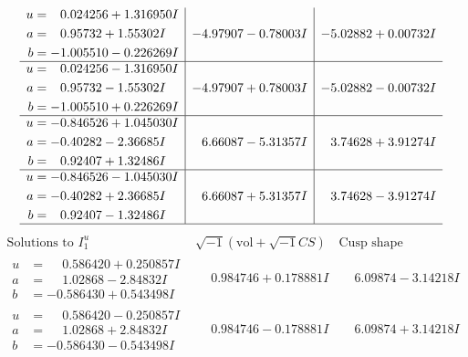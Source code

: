 \documentclass[1p]{elsarticle_modified}
\theoremstyle{definition}
\newcommand{\I}{\sqrt{-1}}
\begin{document}
$$\begin{array}{c|c|c}
\begin{aligned}
u &= \phantom{-}0.024256 + 1.316950 I \\
a &= \phantom{-}0.95732 + 1.55302 I \\
b &= -1.005510 - 0.226269 I\end{aligned}
 & -4.97907 - 0.78003 I & -5.02882 + 0.00732 I \\ \hline\begin{aligned}
u &= \phantom{-}0.024256 - 1.316950 I \\
a &= \phantom{-}0.95732 - 1.55302 I \\
b &= -1.005510 + 0.226269 I\end{aligned}
 & -4.97907 + 0.78003 I & -5.02882 - 0.00732 I \\ \hline\begin{aligned}
u &= -0.846526 + 1.045030 I \\
a &= -0.40282 - 2.36685 I \\
b &= \phantom{-}0.92407 + 1.32486 I\end{aligned}
 & \phantom{-}6.66087 - 5.31357 I & \phantom{-}3.74628 + 3.91274 I \\ \hline\begin{aligned}
u &= -0.846526 - 1.045030 I \\
a &= -0.40282 + 2.36685 I \\
b &= \phantom{-}0.92407 - 1.32486 I\end{aligned}
 & \phantom{-}6.66087 + 5.31357 I & \phantom{-}3.74628 - 3.91274 I\\
 \hline 
 \end{array}$$\newpage$$\begin{array}{c|c|c}  
\text{Solutions to }I^u_{1}& \I (\text{vol} + \sqrt{-1}CS) & \text{Cusp shape}\\
 \hline 
\begin{aligned}
u &= \phantom{-}0.586420 + 0.250857 I \\
a &= \phantom{-}1.02868 - 2.84832 I \\
b &= -0.586430 + 0.543498 I\end{aligned}
 & \phantom{-}0.984746 + 0.178881 I & \phantom{-}6.09874 - 3.14218 I \\ \hline\begin{aligned}
u &= \phantom{-}0.586420 - 0.250857 I \\
a &= \phantom{-}1.02868 + 2.84832 I \\
b &= -0.586430 - 0.543498 I\end{aligned}
 & \phantom{-}0.984746 - 0.178881 I & \phantom{-}6.09874 + 3.14218 I \\ \hline\begin{aligned}

\end{aligned}
\end{array}$$
\end{document}
